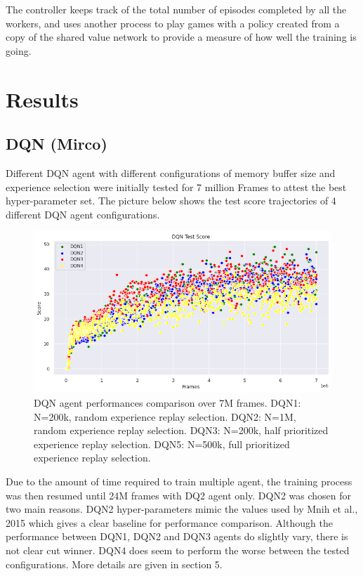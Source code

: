 \documentclass{article}
\begin{document}
The controller keeps track of the total number of episodes completed by all the workers, and uses another process to play games with a policy created from a copy of the shared value network to provide a measure of how well the training is going.


\section{Results}


\subsection{DQN (Mirco)}

Different DQN agent with different configurations of memory buffer size and experience selection were initially tested for 7 million Frames to attest the best hyper-parameter set. The picture below shows the test score trajectories of 4 different DQN agent configurations. 
\begin{figure}[H]
\centering
\includegraphics[scale=0.5]{DQNAgentComparison.PNG}
\caption[width=0.7\textwidth]{DQN agent performances comparison over 7M frames. DQN1: N=200k, random experience replay selection. DQN2: N=1M, random experience replay selection. DQN3: N=200k, half prioritized experience replay selection. DQN5: N=500k, full prioritized experience replay selection.}
\label{fig:DQNAgentComparison}
\end{figure}

Due to the amount of time required to train multiple agent, the training process was then resumed until 24M frames with DQ2 agent only. DQN2 was chosen for two main reasons. DQN2 hyper-parameters mimic the values used by Mnih et al., 2015 which gives a clear baseline for performance comparison. Although the performance between DQN1, DQN2 and DQN3 agents do slightly vary, there is not clear cut winner. DQN4 does seem to perform the worse between the tested configurations. More details are given in section 5.
\end{document}
